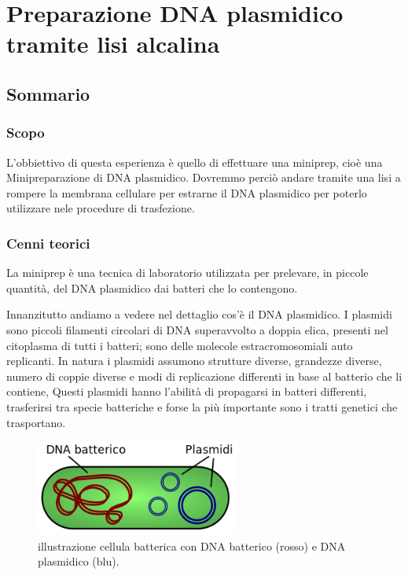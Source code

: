 \section{\LARGE{Preparazione DNA plasmidico tramite lisi alcalina}}

\vspace{0.6cm}


\subsection{Sommario}

\subsubsection{Scopo}

L'obbiettivo di questa esperienza è quello di effettuare una miniprep, cioè una Minipreparazione di DNA plasmidico.
Dovremmo perciò andare tramite una lisi a rompere la membrana cellulare per estrarne il DNA plasmidico per poterlo utilizzare nele procedure di trasfezione.

\subsubsection{Cenni teorici}

La miniprep è una tecnica di laboratorio utilizzata per prelevare, in piccole quantità,
del DNA plasmidico dai batteri che lo contengono.

Innanzitutto andiamo a vedere nel dettaglio cos'è il DNA plasmidico.
I plasmidi sono piccoli filamenti circolari di DNA superavvolto a doppia elica, presenti nel citoplasma di tutti i batteri;
sono delle molecole estracromosomiali auto replicanti.
In natura i plasmidi assumono strutture diverse, grandezze diverse, numero di coppie diverse e modi di replicazione differenti in base al batterio che li contiene,
Questi plasmidi hanno l'abilità di propagarsi in batteri differenti, trasferirsi tra specie batteriche e forse la più importante sono i tratti genetici che trasportano.

\begin{figure}[H]

	\centering
	\includegraphics[width=0.6\textwidth]{./immagini/plasmide.png}
	\caption{illustrazione cellula batterica con DNA batterico (rosso) e DNA plasmidico (blu).}
	\label{plasmide}

\end{figure}

